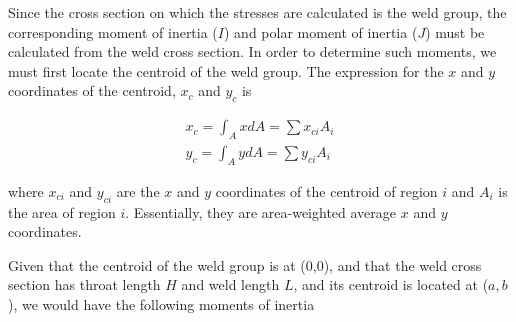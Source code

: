 \documentclass[
10pt,
a4paper,
openany,
svgnames,
]{book}
\begin{document}
Since the cross section on which the stresses are calculated is the weld group, the corresponding moment of inertia ($I$) and polar moment of inertia ($J$) must be calculated from the weld cross section. In order to determine such moments, we must first locate the centroid of the weld group. The expression for the $x$ and $y$ coordinates of the centroid, $x_c$ and $y_c$ is

\begin{align}
  x_c = \int_A xdA = \sum x_{ci}A_i \\
  y_c = \int_A ydA = \sum y_{ci}A_i
\end{align}

where  $x_{ci}$ and $y_{ci}$ are the $x$ and $y$ coordinates of the centroid of region $i$ and $A_i$ is the area of region $i$. Essentially, they are area-weighted average $x$ and $y$ coordinates.

Given that the centroid of the weld group is at (0,0), and that  the weld cross section has throat length $H$ and weld length $L$, and its centroid is located at ($a, b$), we would have the following moments of inertia

\begin{figure}[h]
  \centering
\end{figure}
\end{document}
